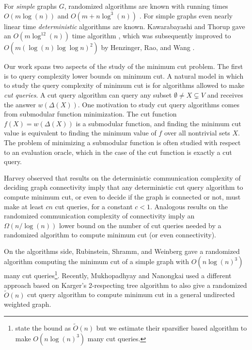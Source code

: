 \documentclass[10pt,a4paper]{article}
\newcommand{\1}{\mathbf{1}}
\theoremstyle{definition}
\begin{document}
For \emph{simple} graphs $G$, randomized algorithms are known with running times $O(m \log(n))$ and $O(m + n \log^3(n))$ \cite{GNT20}.  For simple graphs even nearly linear
time \emph{deterministic} algorithms are known.  Kawarabayashi and Thorup gave an $O(m \log^{12}(n))$ time algorithm \cite{KT19}, which was subsequently improved to
$O(m (\log(n) \log \log n)^2)$ by Henzinger, Rao, and Wang \cite{HRW20}.


Our work spans two aspects of the study of the minimum cut problem.  The first is to query complexity lower bounds on minimum cut.
A natural model in which to study the query
complexity of minimum cut is for algorithms allowed to make \emph{cut queries}.  A cut query algorithm can query any subset $\emptyset \ne X \subsetneq V$ and receives the
answer $w(\Delta(X))$.  One motivation to study cut query algorithms comes from submodular function minimization.  The cut function $f(X) = w(\Delta(X))$ is a submodular
function, and finding the minimum cut value is equivalent to finding the minimum value of $f$ over all nontrivial sets $X$.  The problem of minimizing a submodular function is often studied with respect to an evaluation
oracle, which in the case of the cut function is exactly a cut query.

Harvey \cite{Harvey08} observed that results on the deterministic communication complexity of deciding graph connectivity \cite{HMT88} imply that any deterministic cut query algorithm to compute minimum cut,
or even to decide if the graph is connected or not, must make at least $c n$ cut queries, for a constant $c < 1$.  Analogous results on the randomized communication complexity of connectivity \cite{BFS86}
imply an $\Omega(n/\log(n))$ lower bound on the number of cut queries needed by a randomized algorithm to compute minimum cut (or even connectivity).

On the algorithms side, Rubinstein, Shramm, and Weinberg \cite{RSW18} gave a randomized algorithm computing the minimum cut of a simple graph with $O(n \log(n)^3)$ many
cut queries\footnote{\cite{RSW18} state the bound as $\tilde O(n)$ but we estimate their sparsifier based algorithm to make $O(n \log(n)^3)$ many cut queries.}.
Recently, Mukhopadhyay and Nanongkai \cite{MN20} used a different approach based on Karger's 2-respecting tree algorithm
\cite{Karger00} to also give a randomized $\tilde O(n)$ cut query algorithm to compute minimum cut in a general undirected weighted graph.
\end{document}
